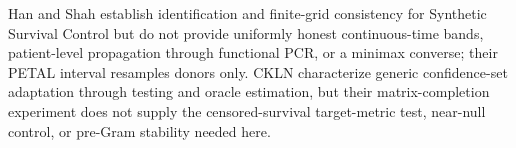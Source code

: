 Han and Shah establish identification and finite-grid consistency for Synthetic Survival Control but do not provide uniformly honest continuous-time bands, patient-level propagation through functional PCR, or a minimax converse; their PETAL interval resamples donors only.  CKLN characterize generic confidence-set adaptation through testing and oracle estimation, but their matrix-completion experiment does not supply the censored-survival target-metric test, near-null control, or pre-Gram stability needed here.